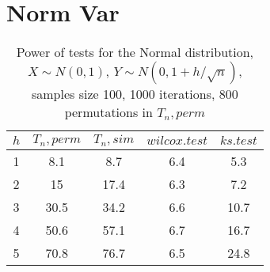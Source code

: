 \documentclass{report}
\begin{document}

\newpage

\section*{Norm Var}

\begin{longtable}{|c|c|c|c|c|}
  \caption{Power of tests for the Normal distribution, \\
           $X\sim N(0,1)$, $Y\sim N(0, 1 + h/\sqrt{n})$, \\
           samples size 100, 1000 iterations, 800 permutations in $T_n, perm$} \\
  \hline
  $h$ & $T_n, perm$ & $T_n, sim$ & $wilcox.test$ & $ks.test$ \\
  \hline
  1 & 8.1 & 8.7 & 6.4 & 5.3 \\
  2 & 15 & 17.4 & 6.3 & 7.2 \\
  3 & 30.5 & 34.2 & 6.6 & 10.7 \\
  4 & 50.6 & 57.1 & 6.7 & 16.7 \\
  5 & 70.8 & 76.7 & 6.5 & 24.8 \\
  \hline
\end{longtable}
\end{document}

